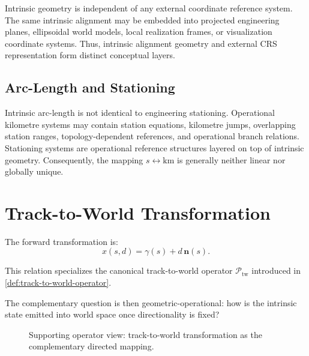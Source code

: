 Intrinsic geometry is independent of any external coordinate reference
system. The same intrinsic alignment may be embedded into projected
engineering planes, ellipsoidal world models, local realization frames,
or visualization coordinate systems. Thus, intrinsic alignment geometry
and external CRS representation form distinct conceptual layers.


\subsection{Arc-Length and Stationing}


Intrinsic arc-length is not identical to engineering stationing.
Operational kilometre systems may contain station equations, kilometre
jumps, overlapping station ranges, topology-dependent references, and
operational branch relations. Stationing systems are operational
reference structures layered on top of intrinsic geometry. Consequently,
the mapping \(s \leftrightarrow \mathrm{km}\) is generally neither linear
nor globally unique.

\section{Track-to-World Transformation}

\begin{definition}
\label{def:state-track-to-world-runtime}
The forward transformation is:
\begin{equation}
x(s,d)
=
\gamma(s)+d\,\mathbf n(s).
\label{eq:state-track-to-world-runtime}
\end{equation}
\end{definition}

This relation specializes the canonical track-to-world operator
\(\mathcal P_{\mathrm{tw}}\) introduced in
\cref{def:track-to-world-operator}.

The complementary question is then geometric-operational: how is the
intrinsic state emitted into world space once directionality is fixed?

\begin{figure}[htbp]
\centering

\caption{Supporting operator view: track-to-world transformation as the complementary directed mapping.}
\label{fig:track-to-world-transformation-support}
\end{figure}

